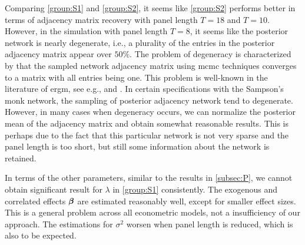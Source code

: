 \documentclass[a4paper]{article}
\begin{document}
Comparing \ref{group:S1} and \ref{group:S2},
it seems like \ref{group:S2} performs better in terms of adjacency matrix recovery with panel length $T=18$ and $T=10$.
However, in the simulation with panel length $T=8$,
it seems like the posterior network is nearly degenerate,
i.e., a plurality of the entries in the posterior adjacency matrix appear over $50\%$.
The problem of degeneracy is characterized by that
the sampled network adjacency matrix using \gls{mcmc} techniques converges to a matrix with all entries being one.
This problem is well-known in the literature of \gls{ergm}, see e.g., \cite{handcock-2003} and \cite{rinaldo-fienberg-zhou-2009}.
In certain specifications with the Sampson's monk network,
the sampling of posterior adjacency network tend to degenerate.
However, in many cases when degeneracy occurs, we can normalize the posterior mean of the adjacency matrix and obtain somewhat reasonable results.
This is perhaps due to the fact that this particular network is not very sparse and the panel length is too short,
but still some information about the network is retained.

In terms of the other parameters,
similar to the results in \autoref{subsec:P},
we cannot obtain significant result for $\lambda$ in \ref{group:S1} consistently.
The exogenous and correlated effects $\boldsymbol{\beta}$ are estimated reasonably well, except for smaller effect sizes.
This is a general problem across all econometric models,
not a insufficiency of our approach.
The estimations for $\sigma^2$ worsen when panel length is reduced,
which is also to be expected.



\end{document}
